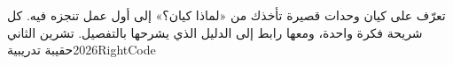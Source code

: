 \documentclass{report}
\begin{document}
{تعرّف على كيان}
{وحدات قصيرة تأخذك من «لماذا كيان؟» إلى أول عمل تنجزه فيه. كل شريحة فكرة واحدة، ومعها رابط إلى الدليل الذي يشرحها بالتفصيل.}
{تشرين الثاني 2026}{حقيبة تدريبية}{RightCode}






\end{document}
